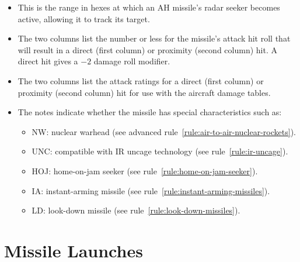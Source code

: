 {\begin{itemize}
    \item {} This is the range in hexes at which an AH missile’s radar seeker becomes active, allowing it to track its target.

    \item {} The two columns list the number or less for the missile’s attack hit roll that will result in a direct (first column) or proximity (second column) hit. A direct hit gives a $-2$ damage roll modifier.

    \item {} The two columns list the attack ratings for a direct (first column) or proximity (second column) hit for use with the aircraft damage tables.

    \item {} The notes indicate whether the missile has special characteristics such as:
    \begin{itemize}
        \item NW: nuclear warhead (see advanced rule~\ref{rule:air-to-air-nuclear-rockets}).
    \item UNC: compatible with IR uncage technology (see rule~\ref{rule:ir-uncage}).
    \item HOJ: home-on-jam seeker (see rule~\ref{rule:home-on-jam-seeker}).
    \item IA: instant-arming missile (see rule~\ref{rule:instant-arming-missiles}).
    \item LD: look-down missile (see rule~\ref{rule:look-down-missiles}).
    
    \end{itemize}

\end{itemize}
}

\section{Missile Launches}
\label{rule:missile-launches}



